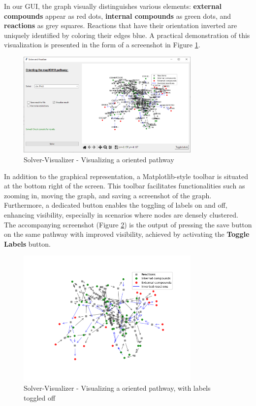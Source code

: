In our GUI, the graph visually distinguishes various elements: \textbf{external compounds} appear as red dots, \textbf{internal compounds} as green dots, and \textbf{reactions} as grey squares. Reactions that have their orientation inverted are uniquely identified by coloring their edges blue. A practical demonstration of this visualization is presented in the form of a screenshot in Figure \ref{fig:vis_labels}.

\begin{figure} [H]
    \centering
    \includegraphics[width=0.8\textwidth]{Design of the User Interface/vis_labels.png}
    \caption{Solver-Visualizer - Visualizing a oriented pathway}
    \label{fig:vis_labels}
\end{figure}

In addition to the graphical representation, a Matplotlib-style toolbar is situated at the bottom right of the screen. This toolbar facilitates functionalities such as zooming in, moving the graph, and saving a screenshot of the graph. Furthermore, a dedicated button enables the toggling of labels on and off, enhancing visibility, especially in scenarios where nodes are densely clustered. The accompanying screenshot (Figure \ref{fig:vis_no_labels}) is the output of pressing the save button on the same pathway with improved visibility, achieved by activating the \textbf{Toggle Labels} button.

\begin{figure}[H]
    \centering
    \includegraphics[width=0.8\textwidth]{Design of the User Interface/vis_no_labels.png}
    \caption{Solver-Visualizer - Visualizing a oriented pathway, with labels toggled off}
    \label{fig:vis_no_labels}
\end{figure}


